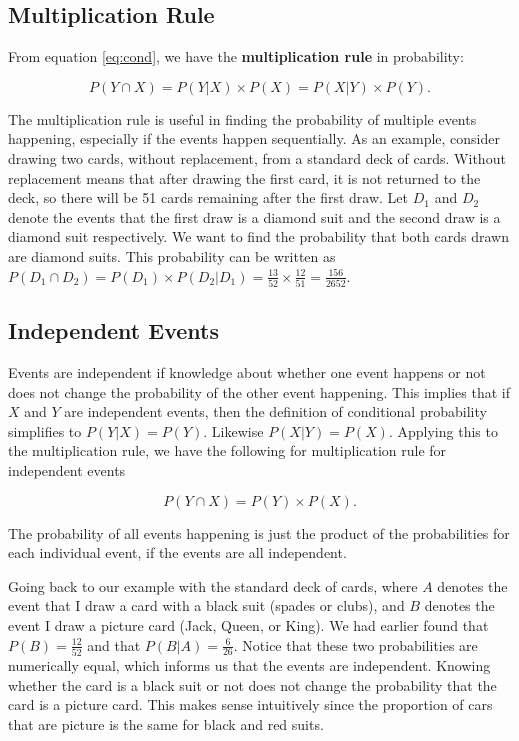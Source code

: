 \documentclass[
]{book}
\begin{document}
\subsection{Multiplication Rule}\label{multiplication-rule}

From equation \eqref{eq:cond}, we have the \textbf{multiplication rule} in probability:

\begin{equation} 
P(Y \cap X) = P(Y|X) \times P(X) = P(X|Y) \times P(Y).
\label{eq:mult}
\end{equation}

The multiplication rule is useful in finding the probability of multiple events happening, especially if the events happen sequentially. As an example, consider drawing two cards, without replacement, from a standard deck of cards. Without replacement means that after drawing the first card, it is not returned to the deck, so there will be 51 cards remaining after the first draw. Let \(D_1\) and \(D_2\) denote the events that the first draw is a diamond suit and the second draw is a diamond suit respectively. We want to find the probability that both cards drawn are diamond suits. This probability can be written as \(P(D_1 \cap D_2) = P(D_1) \times P(D_2|D_1)  = \frac{13}{52} \times \frac{12}{51}  = \frac{156}{2652}\).

\subsection{Independent Events}\label{independent-events}

Events are independent if knowledge about whether one event happens or not does not change the probability of the other event happening. This implies that if \(X\) and \(Y\) are independent events, then the definition of conditional probability simplifies to \(P(Y|X) = P(Y)\). Likewise \(P(X|Y) = P(X)\). Applying this to the multiplication rule, we have the following for multiplication rule for independent events

\begin{equation} 
P(Y \cap X) = P(Y) \times P(X).
\label{eq:mult2}
\end{equation}

The probability of all events happening is just the product of the probabilities for each individual event, if the events are all independent.

Going back to our example with the standard deck of cards, where \(A\) denotes the event that I draw a card with a black suit (spades or clubs), and \(B\) denotes the event I draw a picture card (Jack, Queen, or King). We had earlier found that \(P(B) = \frac{12}{52}\) and that \(P(B|A) = \frac{6}{26}\). Notice that these two probabilities are numerically equal, which informs us that the events are independent. Knowing whether the card is a black suit or not does not change the probability that the card is a picture card. This makes sense intuitively since the proportion of cars that are picture is the same for black and red suits.
\end{document}
